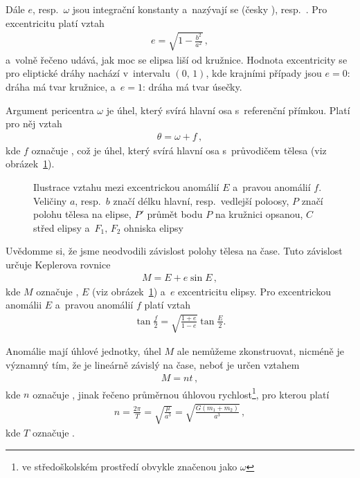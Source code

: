 \documentclass[A4paper, 12pt, oneside]{book}
\begin{document}
Dále $e$, resp.\ $\omega$ jsou integrační konstanty a~nazývají se  (česky ), resp.\ . Pro excentricitu platí vztah
\begin{align}
	e=\sqrt{1-\frac{b^2}{a^2}}\,,
\end{align}
a~volně řečeno udává, jak moc se elipsa liší od kružnice. Hodnota excentricity se pro eliptické dráhy nachází v~intervalu $(0,\,1)$, kde krajními případy jsou $e=0$: dráha má tvar kružnice, a~$e=1$: dráha má tvar úsečky.

Argument pericentra $\omega$ je úhel, který svírá hlavní osa s~referenční přímkou. Platí pro něj vztah
\begin{align}
	\theta=\omega+f\,,
\end{align}
kde $f$ označuje , což je úhel, který svírá hlavní osa s~průvodičem tělesa (viz obrázek~\ref{fig:E}).

\begin{figure}
	\centering
	\caption{Ilustrace vztahu mezi excentrickou anomálií $E$ a~pravou anomálií $f$. Veličiny $a$, resp.\ $b$ značí délku hlavní, resp.\ vedlejší poloosy, $P$ značí polohu tělesa na elipse, $P'$ průmět bodu $P$ na kružnici opsanou, $C$ střed elipsy a~$F_1,\,F_2$ ohniska elipsy} \label{fig:E}
\end{figure}

Uvědomme si, že jsme neodvodili závislost polohy tělesa na čase. Tuto závislost určuje Keplerova rovnice
\begin{align} \label{eq:kepler}
M = E + e\sin E\,,
\end{align}
kde $M$ označuje , $E$  (viz obrázek~\ref{fig:E}) a~$e$ excentricitu elipsy. Pro excentrickou anomálii $E$ a~pravou anomálií $f$ platí vztah
\begin{align} \label {eq:fE}
	\tan \frac{f}{2} = \sqrt{\frac{1+e}{1-e}}\tan \frac{E}{2}.
\end{align}

Anomálie mají úhlové jednotky, úhel $M$ ale nemůžeme zkonstruovat, nicméně je významný tím, že je lineárně závislý na čase, neboť je určen vztahem 
\begin{align} \label{eq:M}
	M=nt\,,
\end{align}
kde $n$ označuje , jinak řečeno průměrnou úhlovou rychlost\footnote{ve středoškolském prostředí obvykle značenou jako $\omega$}, pro kterou platí
\begin{align} \label{eq:n}
	n=\frac{2\pi}{T}=\sqrt{\frac{\mu}{a^3}}=\sqrt{\frac{G(m_1+m_2)}{a^3}}\,,
\end{align}
kde $T$ označuje .
\end{document}
